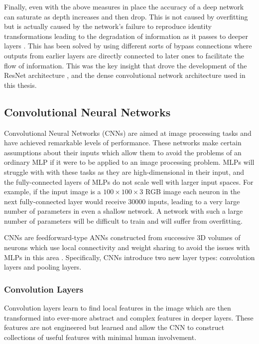 Finally, even with the above measures in place the accuracy of a deep network can saturate as depth increases and then drop. This is not caused by overfitting but is actually caused by the network's failure to reproduce identity transformations leading to the degradation of information as it passes to deeper layers \cite{ResNet}. This has been solved by using different sorts of bypass connections where outputs from earlier layers are directly connected to later ones to facilitate the flow of information. This was the key insight that drove the development of the ResNet architecture \cite{ResNet}, and the dense convolutional network architecture used in this thesis.  


\subsection{Convolutional Neural Networks}
Convolutional Neural Networks (CNNs) are aimed at image processing tasks and have achieved remarkable levels of performance. 
These networks make certain assumptions about their inputs which allow them to avoid the problems of an ordinary MLP if it were to be applied to an image processing problem. 
MLPs will struggle with with these tasks as they are high-dimensional in their input, and the fully-connected layers of MLPs do not scale well with larger input spaces. 
For example, if the input image is a $100\times{}100\times{}3$ RGB image each neuron in the next fully-connected layer would receive $30000$ inputs, leading to a very large number of parameters in even a shallow network. 
A network with such a large number of parameters will be difficult to train and will suffer from overfitting.

CNNs are feedforward-type ANNs constructed from successive 3D volumes of neurons which use local connectivity and weight sharing to avoid the issues with MLPs in this area \cite{CS231n}. Specifically, CNNs introduce two new layer types: convolution layers and pooling layers.

\subsubsection{Convolution Layers}
Convolution layers learn to find local features in the image which are then transformed into ever-more abstract and complex features in deeper layers. 
These features are not engineered but learned and allow the CNN to construct collections of useful features with minimal human involvement.



